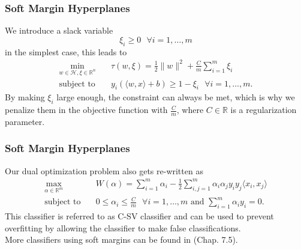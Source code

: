 \documentclass{beamer}
\begin{document}
\begin{frame}{}
	\frametitle{Soft Margin Hyperplanes}
	We introduce a slack variable
	\begin{equation}
		\xi_{ i } \geq 0 \text{ } \forall i = {1, \dots, m}
	\end{equation}
	in the simplest case, this leads to 
	\begin{equation}
		\begin{aligned}
			\min_{w \in \mathcal{H}, \xi \in \mathbb{R}^{n}} \quad & \tau (w, \xi) = \frac{1}{2} \lVert w \rVert^2 + \frac{C}{m} \sum_{i=1}^{m} \xi_{i} \\
			\textrm{subject to} \quad & y_{i} \left( \langle w,x \rangle + b \right) \geq 1 - \xi_{i} \text{ } \forall i = {1, \dots, m}. 
		\end{aligned}
	\end{equation}
    By making $\xi_{i}$ large enough, the constraint can always be met, which is why we penalize them in the objective function with $\frac{C}{m}$, where $C \in \mathbb{R}$ is a regularization parameter.
\end{frame}


\begin{frame}{}
	\frametitle{Soft Margin Hyperplanes}
	Our dual optimization problem also gets re-written as
    \begin{equation} \label{eq:7}
        \begin{aligned}
            \max_{\alpha \in \mathbb{R}^m} \quad & W(\alpha) = \sum_{i=1}^{m} \alpha_i - \frac{1}{2} \sum_{i,j=1}^{m} \alpha_i \alpha_j y_i y_j \langle x_i,x_j \rangle \\
            \textrm{subject to} \quad & 0 \leq \alpha_i \leq \frac{C}{m} \text{ } \forall i = {1, \dots, m} \text{ and } \sum_{i=1}^{m} \alpha_i y_i = 0. 
        \end{aligned}
	\end{equation}
	This classifier is referred to as C-SV classifier and can be used to prevent overfitting by allowing the classifier to make false classifications. \\
	More classifiers using soft margins can be found in \cite{Schoelkopf}(Chap. 7.5).
\end{frame}
\end{document}
